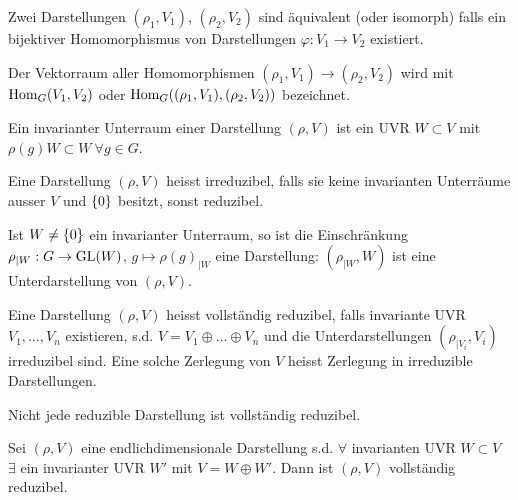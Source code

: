 \begin{definition}[Äquivalent]
    Zwei Darstellungen $(\rho_1,V_1)$, $(\rho_2,V_2)$ sind äquivalent (oder isomorph)
    falls ein bijektiver Homomorphismus von Darstellungen $\varphi: V_1 \rightarrow
    V_2$ existiert.
\end{definition}

\begin{korollar}
    Der Vektorraum aller Homomorphismen $(\rho_1,V_1) \rightarrow
    (\rho_2,V_2)$ wird mit $\text{Hom}_G(V_1,V_2)$ oder $\text{Hom}_G((\rho_1,V_1),(\rho_2,V_2))$
    bezeichnet.
\end{korollar}

\begin{definition}
    Ein invarianter Unterraum einer Darstellung $(\rho,V)$ ist ein UVR
    $W \subset V$ mit $\rho(g)W \subset W \ \forall g \in G$. 
\end{definition}

\begin{definition}[(Ir-)reduzibel]
    Eine Darstellung $(\rho,V)$ heisst irreduzibel, falls sie keine invarianten
    Unterräume ausser $V$ und $\left\{ 0 \right\}$ besitzt, sonst
    reduzibel.
\end{definition}

\begin{lemma}
    Ist $W \neq \left\{ 0 \right\}$ ein invarianter
    Unterraum, so ist die Einschränkung $\rho_{|W}: G \rightarrow \text{GL}(W)$,
    $g \mapsto \rho(g)_{|W}$ eine Darstellung: $(\rho_{|W} , W)$ ist eine
    Unterdarstellung von $(\rho,V)$.
\end{lemma}

\begin{definition}
    Eine Darstellung $(\rho,V)$ heisst vollständig reduzibel, falls
    invariante UVR $V_1,\dots,V_n$ existieren, s.d.
    $V = V_1 \oplus \dots \oplus V_n$ und die Unterdarstellungen
    $(\rho_{|V_i},V_i)$ irreduzibel sind. Eine solche Zerlegung von $V$
    heisst Zerlegung in irreduzible Darstellungen.
\end{definition}

\begin{bemerkung}
    Nicht jede reduzible Darstellung ist vollständig reduzibel.
\end{bemerkung}

\begin{lemma}
    Sei $(\rho,V)$ eine endlichdimensionale Darstellung s.d. $\forall$
    invarianten UVR $W \subset V$ $\exists$ ein invarianter UVR $W'$ mit
    $V = W \oplus W'$. Dann ist $(\rho,V)$ vollständig reduzibel.
\end{lemma}

